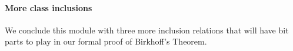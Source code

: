 \paragraph{More class inclusions}\label{more-class-inclusions}

We conclude this module with three more inclusion relations that will
have bit parts to play in our formal proof of Birkhoff's Theorem.

\begin{code}%
\>[0]\<%
\\
\>[0]\AgdaSpace{}%
\AgdaSymbol{:}\AgdaSpace{}%
\AgdaSymbol{\{}\AgdaSpace{}%
\AgdaSpace{}%
\AgdaSymbol{:}\AgdaSpace{}%
\AgdaSymbol{\}\{}\AgdaSpace{}%
\AgdaSymbol{:}\AgdaSpace{}%
\AgdaSpace{}%
\AgdaSymbol{(}\AgdaSpace{}%
\AgdaSpace{}%
\AgdaSymbol{)(}\AgdaSpace{}%
\AgdaSymbol{)\}}\<%
\\
\>[0][@{}l@{\AgdaIndent{0}}]%
\>[1]%
\>[6]\AgdaSymbol{\{}\AgdaSymbol{\}\{}\AgdaSymbol{\}}\AgdaSpace{}%
\AgdaSpace{}%
\AgdaSpace{}%
\AgdaSymbol{\{}\AgdaSymbol{\}\{}\AgdaSymbol{\}}\AgdaSpace{}%
\<%
\\
\>[0]\AgdaSpace{}%
\AgdaSymbol{(}\AgdaSpace{}%
\AgdaSymbol{)}\AgdaSpace{}%
\AgdaSymbol{=}\AgdaSpace{}%
\AgdaSpace{}%
\<%
\\
\>[0]\AgdaSymbol{\{}\AgdaSymbol{\}}\AgdaSpace{}%
\AgdaSymbol{(}\AgdaSpace{}%
\AgdaSymbol{)}\AgdaSpace{}%
\AgdaSymbol{=}\AgdaSpace{}%
\AgdaSpace{}%
\AgdaSymbol{(}\AgdaSymbol{\{}\AgdaSymbol{\}\{}\AgdaSymbol{\}}\AgdaSpace{}%
\AgdaSymbol{)}\<%
\\
\>[0]\AgdaSymbol{\{}\AgdaSymbol{\}\{}\AgdaSymbol{\}}\AgdaSpace{}%
\AgdaSymbol{(}\AgdaSpace{}%
\AgdaSymbol{)}\AgdaSpace{}%
\AgdaSymbol{=}\AgdaSpace{}%
\AgdaSpace{}%
\AgdaSymbol{(}\AgdaSymbol{\{}\AgdaSymbol{\}\{}\AgdaSymbol{\}}\AgdaSpace{}%
\AgdaSymbol{)}\<%

\end{code}
